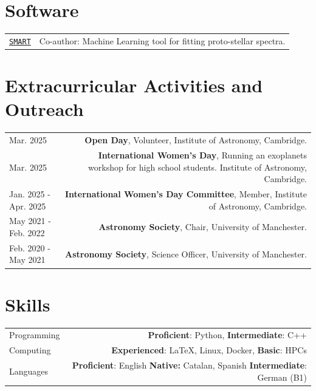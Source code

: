 \documentclass{article}
\begin{document}
\section*{Software}

\begin{tabular}{L!{\vrule}R}
  \href{https://github.com/claudiajanomunoz/SMART}{\texttt{SMART}} & Co-author: Machine Learning tool for fitting proto-stellar spectra. \\
\end{tabular}

\section*{Extracurricular Activities and Outreach}
\begin{tabular}{L!{\vrule}R}
  Mar. 2025 & \textbf{Open Day}, Volunteer, Institute of Astronomy, Cambridge.\\
  Mar. 2025 & \textbf{International Women's Day}, Running an exoplanets workshop for high school students. Institute of Astronomy, Cambridge.\\
  Jan. 2025 - Apr. 2025 & \textbf{International Women's Day Committee}, Member, Institute of Astronomy, Cambridge. \\
  May 2021 - Feb. 2022 & \textbf{Astronomy Society}, Chair, University of Manchester. \\
  Feb. 2020 - May 2021 & \textbf{Astronomy Society}, Science Officer, University of Manchester. \\

\end{tabular}

\section*{Skills}

\begin{tabular}{L!{\vrule}R}
	Programming & \textbf{Proficient}: Python, \textbf{Intermediate}: C++\\
	Computing & \textbf{Experienced}: LaTeX, Linux, Docker, \textbf{Basic}: HPCs \\
	Languages & \textbf{Proficient}: English \textbf{Native:} Catalan, Spanish \textbf{Intermediate}: German (B1)
\end{tabular}
\end{document}
